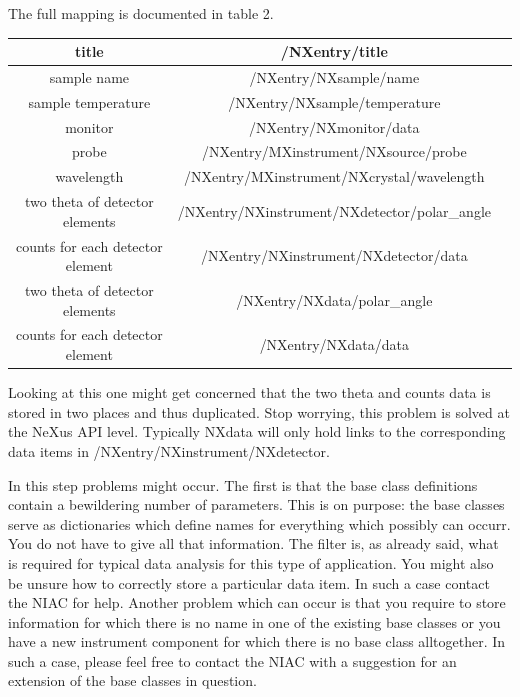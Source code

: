 \documentclass[a4paper]{article}\usepackage[dvips]{graphicx}
\begin{document}
The full mapping is documented in table 2.


\begin{table}[!ht]
\begin{tabular}{|c|c|c|}
\hline
 title&/NXentry/title\\ \hline
sample name &/NXentry/NXsample/name\\ \hline
sample temperature &/NXentry/NXsample/temperature\\ \hline
monitor&/NXentry/NXmonitor/data\\ \hline
probe&/NXentry/MXinstrument/NXsource/probe\\ \hline
wavelength&/NXentry/MXinstrument/NXcrystal/wavelength\\ \hline
two theta of detector elements&/NXentry/NXinstrument/NXdetector/polar\_angle\\ \hline
counts for each detector element&/NXentry/NXinstrument/NXdetector/data\\ \hline
two theta of detector elements&/NXentry/NXdata/polar\_angle\\ \hline
counts for each detector element&/NXentry/NXdata/data\\ \hline
\end{tabular}
\end{table}Looking at this one might get concerned that the two theta and counts data is stored in two places and 
thus duplicated. Stop worrying, this problem is solved at the NeXus API level. Typically NXdata will only hold links 
to the corresponding data items in /NXentry/NXinstrument/NXdetector.



In this step problems might occur. The first is that the base class definitions contain a bewildering number of parameters. 
This is on purpose: the base classes serve as dictionaries which define names for everything which possibly can occurr. You do 
not have to give all that information. The filter is, as already said, what is required for typical data analysis for this type of 
application. You might also be unsure how to correctly store a particular data item. In such a case contact the NIAC for help.
Another problem which can occur is that you require to store information for which there is no name in one of 
the existing base classes or you have a new instrument component for which there is no base class alltogether. In such a case, 
please feel free to contact the NIAC with a suggestion for an extension of the base classes in question.
\end{document}
